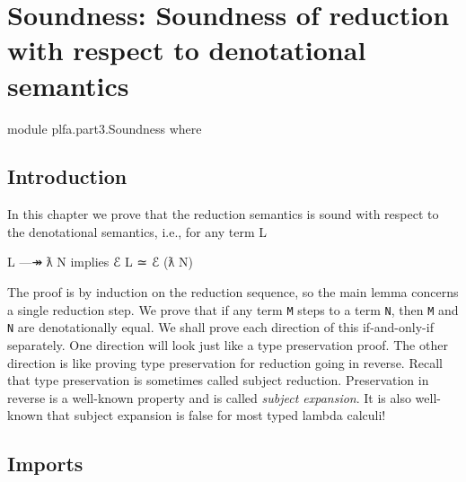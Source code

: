 \hypertarget{Soundness}{%
\chapter{Soundness: Soundness of reduction with respect to denotational
semantics}\label{Soundness}}

\begin{fence}
\begin{code}
module plfa.part3.Soundness where
\end{code}
\end{fence}

\hypertarget{introduction}{%
\section{Introduction}\label{introduction}}

In this chapter we prove that the reduction semantics is sound with
respect to the denotational semantics, i.e., for any term L

\begin{myDisplay}
L —↠ ƛ N  implies  ℰ L ≃ ℰ (ƛ N)
\end{myDisplay}

The proof is by induction on the reduction sequence, so the main lemma
concerns a single reduction step. We prove that if any term \texttt{M}
steps to a term \texttt{N}, then \texttt{M} and \texttt{N} are
denotationally equal. We shall prove each direction of this
if-and-only-if separately. One direction will look just like a type
preservation proof. The other direction is like proving type
preservation for reduction going in reverse. Recall that type
preservation is sometimes called subject reduction. Preservation in
reverse is a well-known property and is called \emph{subject expansion}.
It is also well-known that subject expansion is false for most typed
lambda calculi!

\hypertarget{imports}{%
\section{Imports}\label{imports}}

